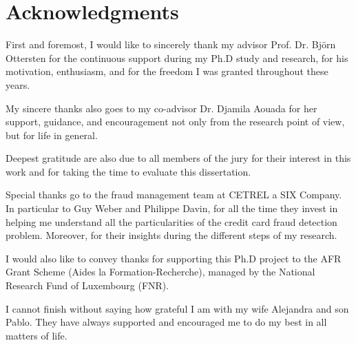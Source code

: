 
\chapter*{Acknowledgments}

First and foremost, I would like to sincerely thank my advisor Prof. Dr. Bj\"orn Ottersten for the 
continuous support during my Ph.D study and research, for his motivation, enthusiasm, and for the 
freedom I was granted throughout these years.

My sincere thanks also goes to my co-advisor Dr. Djamila Aouada for her support, guidance, and 
encouragement not only from the research point of view, but for life in general. 

Deepest gratitude are also due to all members of the jury for their interest in this work and for 
taking the  time to evaluate this dissertation.

Special thanks go to the fraud management team at CETREL a SIX Company. In particular to Guy Weber 
and Philippe Davin, for all the time they invest in helping me understand all the 
particularities of the credit card fraud detection problem. Moreover, for their insights 
during the different steps of my research.

I would also like to convey thanks for supporting this Ph.D project to the AFR Grant Scheme (Aides 
la Formation-Recherche), managed by the National Research Fund of Luxembourg (FNR).

I cannot finish without saying how grateful I am with my wife Alejandra and son Pablo. They have 
always supported and encouraged me to do my best in all matters of life.